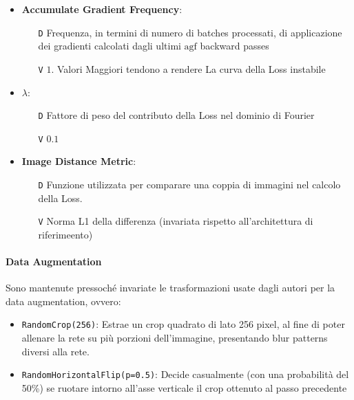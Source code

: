 \documentclass[a4paper,10pt,twocolumn]{article}
\begin{document}
\begin{itemize}[topsep=0pt, noitemsep]
  \item
    \textbf{Accumulate Gradient Frequency}:
    \begin{itemize}[topsep=0pt, noitemsep]
      \item[\texttt{D}] Frequenza, in termini di numero di batches processati, di applicazione dei gradienti calcolati dagli ultimi
        $\mathrm{agf}$ backward passes
      \item[\texttt{V}] $1$. Valori Maggiori tendono a rendere La curva della Loss instabile
    \end{itemize}

  \item
    \textbf{$\lambda$}:
    \begin{itemize}[topsep=0pt, noitemsep]
      \item[\texttt{D}] Fattore di peso del contributo della Loss nel dominio di Fourier
      \item[\texttt{V}] $0.1$
    \end{itemize}

  \item
    \textbf{Image Distance Metric}:
    \begin{itemize}[topsep=0pt, noitemsep]
      \item[\texttt{D}] Funzione utilizzata per comparare una coppia di immagini nel calcolo della Loss.
      \item[\texttt{V}] Norma L1 della differenza (invariata rispetto all'architettura di riferimeento)
    \end{itemize}
\end{itemize}

\paragraph{Data Augmentation}

Sono mantenute pressoché invariate le trasformazioni usate dagli autori per la data augmentation, ovvero:
\begin{itemize}
  \item \texttt{RandomCrop(256)}: Estrae un crop quadrato di lato 256 pixel, al fine di poter allenare la rete su pi\`u porzioni dell'immagine, presentando
  blur patterns diversi alla rete.
  \item \texttt{RandomHorizontalFlip(p=0.5)}: Decide casualmente (con una probabilità del 50\%) se ruotare intorno all'asse verticale il crop ottenuto al passo precedente
\end{itemize}
\end{document}
